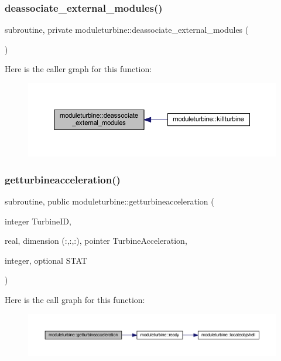 \subsubsection{\texorpdfstring{deassociate\+\_\+external\+\_\+modules()}{deassociate\_external\_modules()}}
{\footnotesize\ttfamily subroutine, private moduleturbine\+::deassociate\+\_\+external\+\_\+modules (\begin{DoxyParamCaption}{ }\end{DoxyParamCaption})\hspace{0.3cm}{\ttfamily [private]}}

Here is the caller graph for this function\+:\nopagebreak
\begin{figure}[H]
\begin{center}
\leavevmode
\includegraphics[width=350pt]{namespacemoduleturbine_a9ba3c2694581c5c8d730d5cacd9c2a61_icgraph}
\end{center}
\end{figure}
\mbox{\label{namespacemoduleturbine_a5ce2cf1858c4b390f22dc2451c692f3c}} 
\subsubsection{\texorpdfstring{getturbineacceleration()}{getturbineacceleration()}}
{\footnotesize\ttfamily subroutine, public moduleturbine\+::getturbineacceleration (\begin{DoxyParamCaption}\item[{integer}]{Turbine\+ID,  }\item[{real, dimension (\+:,\+:,\+:), pointer}]{Turbine\+Acceleration,  }\item[{integer, optional}]{S\+T\+AT }\end{DoxyParamCaption})}

Here is the call graph for this function\+:\nopagebreak
\begin{figure}[H]
\begin{center}
\leavevmode
\includegraphics[width=350pt]{namespacemoduleturbine_a5ce2cf1858c4b390f22dc2451c692f3c_cgraph}
\end{center}
\end{figure}
\mbox{\label{namespacemoduleturbine_a14dcb5e2f0dfed8ce2da9616f01b2a58}} 
